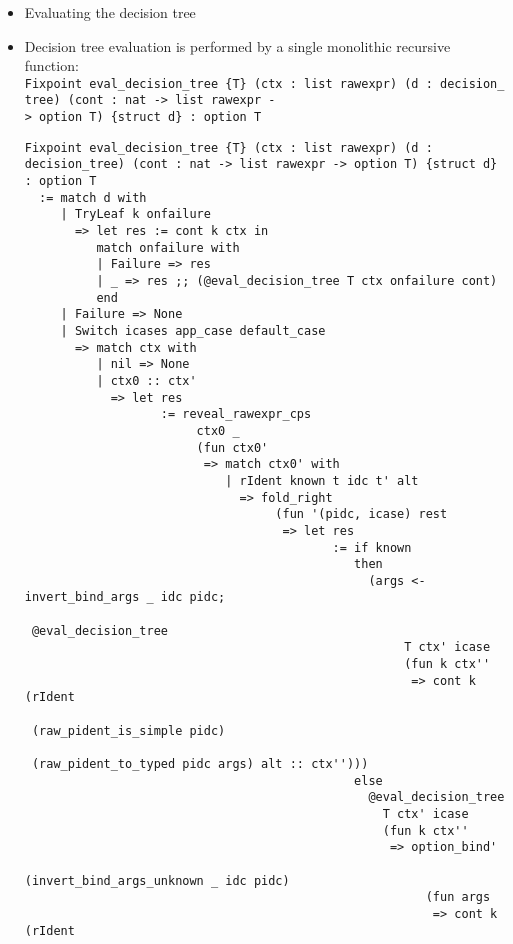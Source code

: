 \begin{itemize}
\item
  Evaluating the decision tree
\item
  Decision tree evaluation is performed by a single monolithic recursive
  function:
  \texttt{Fixpoint\ eval\_decision\_tree\ \{T\}\ (ctx\ :\ list\ rawexpr)\ (d\ :\ decision\_tree)\ (cont\ :\ nat\ -\textgreater{}\ list\ rawexpr\ -\textgreater{}\ option\ T)\ \{struct\ d\}\ :\ option\ T}

\begin{verbatim}
Fixpoint eval_decision_tree {T} (ctx : list rawexpr) (d : decision_tree) (cont : nat -> list rawexpr -> option T) {struct d} : option T
  := match d with
     | TryLeaf k onfailure
       => let res := cont k ctx in
          match onfailure with
          | Failure => res
          | _ => res ;; (@eval_decision_tree T ctx onfailure cont)
          end
     | Failure => None
     | Switch icases app_case default_case
       => match ctx with
          | nil => None
          | ctx0 :: ctx'
            => let res
                   := reveal_rawexpr_cps
                        ctx0 _
                        (fun ctx0'
                         => match ctx0' with
                            | rIdent known t idc t' alt
                              => fold_right
                                   (fun '(pidc, icase) rest
                                    => let res
                                           := if known
                                              then
                                                (args <- invert_bind_args _ idc pidc;
                                                   @eval_decision_tree
                                                     T ctx' icase
                                                     (fun k ctx''
                                                      => cont k (rIdent
                                                                   (raw_pident_is_simple pidc)
                                                                   (raw_pident_to_typed pidc args) alt :: ctx'')))
                                              else
                                                @eval_decision_tree
                                                  T ctx' icase
                                                  (fun k ctx''
                                                   => option_bind'
                                                        (invert_bind_args_unknown _ idc pidc)
                                                        (fun args
                                                         => cont k (rIdent

\end{verbatim}
\end{itemize}
